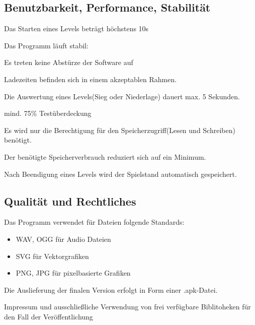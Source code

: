 \documentclass{scrartcl}
\begin{document}
\begin{nflist}
    \item
\end{nflist}

\subsection{Benutzbarkeit, Performance, Stabilität}
\begin{nflist}[resume]
	\item Das Starten eines Levels beträgt höchstens 10s 
	\item Das Programm läuft stabil: 
	\begin{nflist}
		\item Es treten keine Abstürze der Software auf 
		\item Ladezeiten befinden sich in einem akzeptablen Rahmen. 
	\end{nflist}
	\item Die Auswertung eines Levels(Sieg oder Niederlage) dauert max. 5 Sekunden. 
	\item mind. 75\% Testüberdeckung 
	\item Es wird nur die Berechtigung für den Speicherzugriff(Lesen
	und Schreiben) benötigt. 
	\item Der benötigte Speicherverbrauch reduziert sich auf ein Minimum. 
	\item Nach Beendigung eines Levels wird der Spielstand automatisch gespeichert.
\end{nflist}

\subsection{Qualität und Rechtliches}

\begin{nflist}[resume]
	\item Das Programm verwendet für Dateien folgende Standards: 
	\begin{itemize}
		\item WAV, OGG für Audio Dateien 
		\item SVG für Vektorgrafiken 
		\item PNG, JPG für pixelbasierte Grafiken 
	\end{itemize}
	\item Die Auslieferung der finalen Version erfolgt in Form einer .apk-Datei.
	\item Impressum und ausschließliche Verwendung von frei verfügbare Biblitoheken
	für den Fall der Veröffentlichung
\end{nflist}
\end{document}
